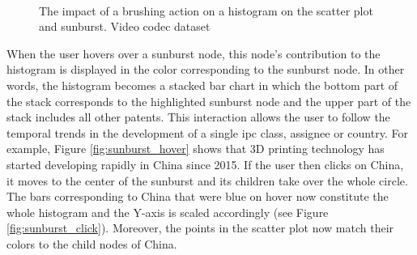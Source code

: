 \begin{figure}[!]
    \centering
    \\
    \caption{The impact of a brushing action on a histogram on the scatter plot and sunburst. Video codec dataset}
    \label{fig:histogram_brushing_interaction}
\end{figure}

When the user hovers over a sunburst node, this node's contribution to the histogram is displayed in the color corresponding to the sunburst node.
In other words, the histogram becomes a stacked bar chart in which the bottom part of the stack corresponds to the highlighted sunburst node and the upper part of the stack includes all other patents.
This interaction allows the user to follow the temporal trends in the development of a single \gls{ipc} class, assignee or country.
For example, Figure \autoref{fig:sunburst_hover} shows that 3D printing technology has started developing rapidly in China since 2015.
If the user then clicks on China, it moves to the center of the sunburst and its children take over the whole circle.
The bars corresponding to China that were blue on hover now constitute the whole histogram and the Y-axis is scaled accordingly (see Figure \autoref{fig:sunburst_click}).
Moreover, the points in the scatter plot now match their colors to the child nodes of China.

